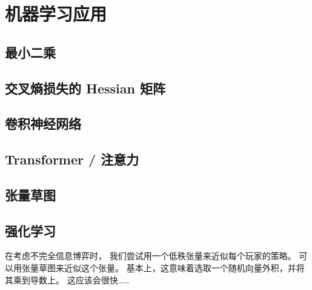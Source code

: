 
\chapter{机器学习应用}

\section{最小二乘}

\section{交叉熵损失的 Hessian 矩阵}

\section{卷积神经网络}

\section{Transformer / 注意力}

\section{张量草图}

\section{强化学习}

在考虑不完全信息博弈时，
我们尝试用一个低秩张量来近似每个玩家的策略。
可以用张量草图来近似这个张量。
基本上，这意味着选取一个随机向量外积，并将其乘到导数上。
这应该会很快……
